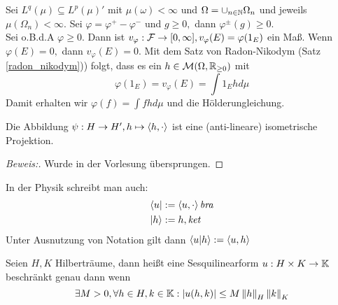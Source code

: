 \begin{ex}
Sei $L^q(\mu) \subseteq L^p(\mu)'$ mit $\mu(\omega) < \infty$ und $\Omega = \cup_{n \in \mathbb{N}} \Omega_n$ und jeweils $\mu(\Omega_n) < \infty.$ Sei $\varphi = \varphi^+ - \varphi^-$ und $g \geq 0,$ dann $\varphi^{\pm}(g) \geq 0.$ \\
Sei o.B.d.A $\varphi \geq 0.$ Dann ist $v_{\varphi}: \mathcal{F} \to [0, \infty], v_{\varphi}(E) = \varphi(1_E)$ ein Maß. Wenn $\varphi(E) = 0,$ dann $v_{\varphi}(E) = 0.$ Mit dem Satz von Radon-Nikodym (Satz \ref{radon_nikodym})) folgt, dass es ein $h \in \mathcal{M}(\Omega, \mathbb{R}_{\geq 0})$ mit \[\varphi(1_E) = v_{\varphi}(E) = \int1_E h d\mu\]
Damit erhalten wir $\varphi(f) = \int fhd\mu$ und die Hölderungleichung.
\end{ex}

\begin{theorem} \label{riez2}
Die Abbildung $\psi: H \to H', h \mapsto \left\langle h, \cdot\right\rangle$ ist eine (anti-lineare) isometrische Projektion.

\begin{proof}[Beweis:] Wurde in der Vorlesung übersprungen.
\end{proof}
\end{theorem}


\begin{rem}
    In der Physik schreibt man auch:
    \begin{align*}
        & \langle u | := \left\langle u, \cdot\right\rangle \textit{bra} \\
        & |h\rangle := h, \textit{ket} \\
    \end{align*} Unter Ausnutzung von Notation gilt dann $\left\langle u | h\right\rangle := \left\langle u, h\right\rangle$
\end{rem}

\begin{definition} \label{sesq_bound}
    Seien $H, K$ Hilberträume, dann heißt eine Sesquilinearform $u: H \times K \to \mathbb{K}$ beschränkt genau dann wenn \[\exists M > 0, \forall h \in H, k \in \mathbb{K}: \left\lvert u(h, k) \right\rvert \leq M \left\lVert h\right\rVert_H \left\lVert k\right\rVert_K\]
\end{definition}

